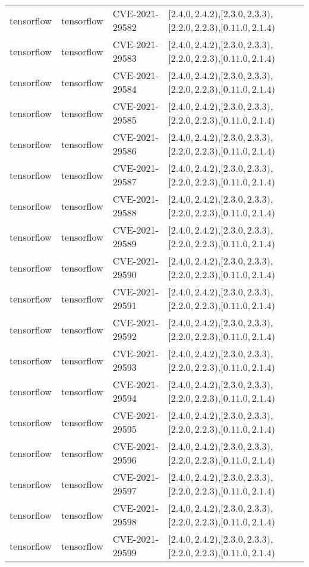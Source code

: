 \begin{tabular}{llll}
tensorflow & tensorflow & CVE-2021-29582 & $[2.4.0,2.4.2)$,$[2.3.0,2.3.3)$,$[2.2.0,2.2.3)$,$[0.11.0,2.1.4)$ \\
tensorflow & tensorflow & CVE-2021-29583 & $[2.4.0,2.4.2)$,$[2.3.0,2.3.3)$,$[2.2.0,2.2.3)$,$[0.11.0,2.1.4)$ \\
tensorflow & tensorflow & CVE-2021-29584 & $[2.4.0,2.4.2)$,$[2.3.0,2.3.3)$,$[2.2.0,2.2.3)$,$[0.11.0,2.1.4)$ \\
tensorflow & tensorflow & CVE-2021-29585 & $[2.4.0,2.4.2)$,$[2.3.0,2.3.3)$,$[2.2.0,2.2.3)$,$[0.11.0,2.1.4)$ \\
tensorflow & tensorflow & CVE-2021-29586 & $[2.4.0,2.4.2)$,$[2.3.0,2.3.3)$,$[2.2.0,2.2.3)$,$[0.11.0,2.1.4)$ \\
tensorflow & tensorflow & CVE-2021-29587 & $[2.4.0,2.4.2)$,$[2.3.0,2.3.3)$,$[2.2.0,2.2.3)$,$[0.11.0,2.1.4)$ \\
tensorflow & tensorflow & CVE-2021-29588 & $[2.4.0,2.4.2)$,$[2.3.0,2.3.3)$,$[2.2.0,2.2.3)$,$[0.11.0,2.1.4)$ \\
tensorflow & tensorflow & CVE-2021-29589 & $[2.4.0,2.4.2)$,$[2.3.0,2.3.3)$,$[2.2.0,2.2.3)$,$[0.11.0,2.1.4)$ \\
tensorflow & tensorflow & CVE-2021-29590 & $[2.4.0,2.4.2)$,$[2.3.0,2.3.3)$,$[2.2.0,2.2.3)$,$[0.11.0,2.1.4)$ \\
tensorflow & tensorflow & CVE-2021-29591 & $[2.4.0,2.4.2)$,$[2.3.0,2.3.3)$,$[2.2.0,2.2.3)$,$[0.11.0,2.1.4)$ \\
tensorflow & tensorflow & CVE-2021-29592 & $[2.4.0,2.4.2)$,$[2.3.0,2.3.3)$,$[2.2.0,2.2.3)$,$[0.11.0,2.1.4)$ \\
tensorflow & tensorflow & CVE-2021-29593 & $[2.4.0,2.4.2)$,$[2.3.0,2.3.3)$,$[2.2.0,2.2.3)$,$[0.11.0,2.1.4)$ \\
tensorflow & tensorflow & CVE-2021-29594 & $[2.4.0,2.4.2)$,$[2.3.0,2.3.3)$,$[2.2.0,2.2.3)$,$[0.11.0,2.1.4)$ \\
tensorflow & tensorflow & CVE-2021-29595 & $[2.4.0,2.4.2)$,$[2.3.0,2.3.3)$,$[2.2.0,2.2.3)$,$[0.11.0,2.1.4)$ \\
tensorflow & tensorflow & CVE-2021-29596 & $[2.4.0,2.4.2)$,$[2.3.0,2.3.3)$,$[2.2.0,2.2.3)$,$[0.11.0,2.1.4)$ \\
tensorflow & tensorflow & CVE-2021-29597 & $[2.4.0,2.4.2)$,$[2.3.0,2.3.3)$,$[2.2.0,2.2.3)$,$[0.11.0,2.1.4)$ \\
tensorflow & tensorflow & CVE-2021-29598 & $[2.4.0,2.4.2)$,$[2.3.0,2.3.3)$,$[2.2.0,2.2.3)$,$[0.11.0,2.1.4)$ \\
tensorflow & tensorflow & CVE-2021-29599 & $[2.4.0,2.4.2)$,$[2.3.0,2.3.3)$,$[2.2.0,2.2.3)$,$[0.11.0,2.1.4)$ \\

\end{tabular}
